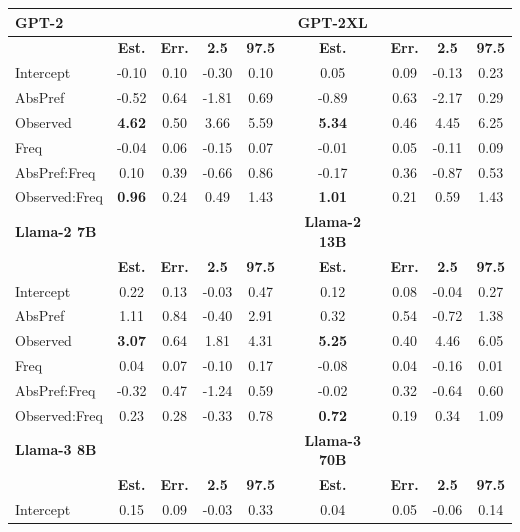 \documentclass[
  12pt,
  letterpaper,
]{scrreprt}
\begin{document}
\begin{table}
{    \centering
    \begin{tabular}{l|cccc|cccc}
    \hline 
        \textbf{GPT-2} & & & & & \textbf{GPT-2XL} \\
        \hline
         & \textbf{Est.} & \textbf{Err.} & \textbf{2.5} & \textbf{97.5} & \textbf{Est.} & \textbf{Err.} & \textbf{2.5} & \textbf{97.5} \\
         \hline
         Intercept & -0.10 & 0.10 & -0.30 & 0.10 & 0.05 & 0.09 & -0.13 & 0.23\\
         AbsPref & -0.52 & 0.64 & -1.81 & 0.69 & -0.89 & 0.63 & -2.17 & 0.29 \\
         Observed & \textbf{4.62} & 0.50 & 3.66 & 5.59 & \textbf{5.34} & 0.46 & 4.45 & 6.25 \\
         Freq & -0.04 & 0.06 & -0.15 & 0.07 & -0.01 & 0.05 & -0.11 & 0.09 \\
         AbsPref:Freq & 0.10 & 0.39 & -0.66 & 0.86 & -0.17 & 0.36 & -0.87 & 0.53 \\
         Observed:Freq & \textbf{0.96} & 0.24 & 0.49 & 1.43 & \textbf{1.01} & 0.21 & 0.59 & 1.43 \\
         \hline
         \textbf{Llama-2 7B} & & & & & \textbf{Llama-2 13B} \\
        \hline
         & \textbf{Est.} & \textbf{Err.} & \textbf{2.5} & \textbf{97.5} & \textbf{Est.} & \textbf{Err.} & \textbf{2.5} & \textbf{97.5} \\
         \hline
         Intercept & 0.22 & 0.13 & -0.03 & 0.47 & 0.12 & 0.08 & -0.04 & 0.27 \\
         AbsPref & 1.11 & 0.84 & -0.40 & 2.91 &  0.32 & 0.54 & -0.72 & 1.38  \\
         Observed & \textbf{3.07} & 0.64 & 1.81 & 4.31 & \textbf{5.25} & 0.40 & 4.46 & 6.05\\
         Freq & 0.04 & 0.07 & -0.10 & 0.17 & -0.08 & 0.04 & -0.16 & 0.01 \\
         AbsPref:Freq & -0.32 & 0.47 & -1.24 & 0.59 & -0.02 & 0.32 & -0.64 & 0.60 \\
         Observed:Freq & 0.23 & 0.28 & -0.33 & 0.78 & \textbf{0.72} & 0.19 & 0.34 & 1.09  \\
         \hline
         \textbf{Llama-3 8B} & & & & & \textbf{Llama-3 70B}\\
        \hline
         & \textbf{Est.} & \textbf{Err.} & \textbf{2.5} & \textbf{97.5} & \textbf{Est.} & \textbf{Err.} & \textbf{2.5} & \textbf{97.5} \\
         \hline
         Intercept & 0.15 & 0.09 & -0.03 & 0.33 & 0.04 & 0.05 & -0.06 & 0.14 \\

\end{tabular}}
\end{table}
\end{document}
